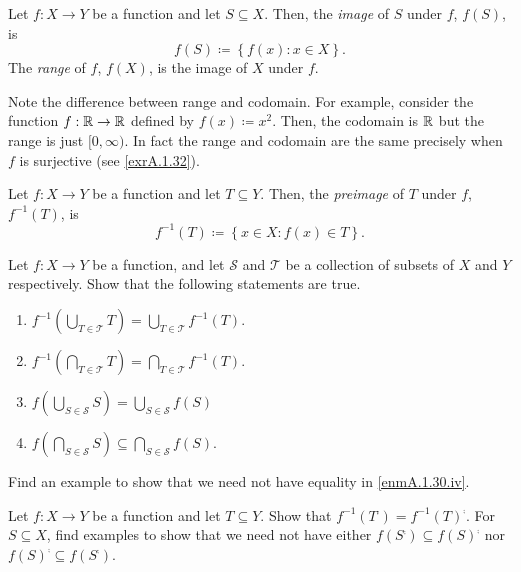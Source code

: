 \begin{dfn}[Image]
Let $f:X\rightarrow Y$ be a function and let $S\subseteq X$.  Then, the \emph{image} of $S$ under $f$, $f(S)$, is
\begin{equation}
f(S)\coloneqq \left\{ f(x):x\in X\right\} .
\end{equation}
The \emph{range} of $f$, $f(X)$, is the image of $X$ under $f$.
\begin{rmk}
Note the difference between range and codomain.  For example, consider the function $f:\mathbb{R} \rightarrow \mathbb{R}$ defined by $f(x)\coloneqq x^2$.  Then, the codomain is $\mathbb{R}$ but the range is just $[0,\infty )$.  In fact the range and codomain are the same precisely when $f$ is surjective (see \cref{exrA.1.32}).
\end{rmk}
\end{dfn}
\begin{dfn}[Preimage]
Let $f:X\rightarrow Y$ be a function and let $T\subseteq Y$.  Then, the \emph{preimage} of $T$ under $f$, $f^{-1}(T)$, is
\begin{equation}
f^{-1}(T)\coloneqq \left\{ x\in X:f(x)\in T\right\} .
\end{equation}
\end{dfn}
\begin{exr}\label{exrA.1.30}
Let $f:X\rightarrow Y$ be a function, and let $\mathcal{S}$ and $\mathcal{T}$ be a collection of subsets of $X$ and $Y$ respectively.  Show that the following statements are true.
\begin{enumerate}
\item \label{enmA.1.30.i}$f^{-1}\left( \bigcup _{T\in \mathcal{T}}T\right) =\bigcup _{T\in \mathcal{T}}f^{-1}(T)$.
\item \label{enmA.1.30.ii}$f^{-1}\left( \bigcap _{T\in \mathcal{T}}T\right) =\bigcap _{T\in \mathcal{T}}f^{-1}(T)$.
\item \label{enmA.1.30.iii}$f\left( \bigcup _{S\in \mathcal{S}}S\right) =\bigcup _{S\in \mathcal{S}}f(S)$
\item \label{enmA.1.30.iv}$f\left( \bigcap _{S\in \mathcal{S}}S\right) \subseteq \bigcap _{S\in \mathcal{S}}f(S)$.
\end{enumerate}
Find an example to show that we need not have equality in \ref{enmA.1.30.iv}.
\end{exr}
\begin{exr}
Let $f:X\rightarrow Y$ be a function and let $T\subseteq Y$.  Show that $f^{-1}(T^{\comp})=f^{-1}(T)^{\comp}$.  For $S\subseteq X$, find examples to show that we need not have either $f(S^{\comp})\subseteq f(S)^{\comp}$ nor $f(S)^{\comp}\subseteq f(S^{\comp})$.
\end{exr}
